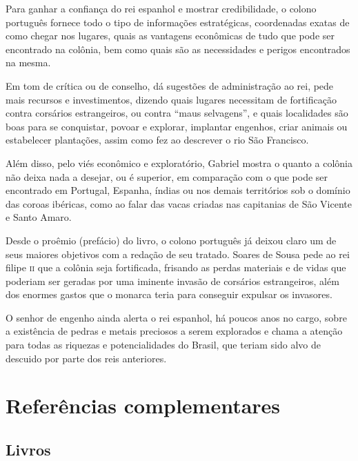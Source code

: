\documentclass[12pt]{extarticle}
\begin{document}
Para ganhar a confiança do rei espanhol e mostrar credibilidade, o
colono português fornece todo o tipo de informações estratégicas,
coordenadas exatas de como chegar nos lugares, quais as vantagens
econômicas de tudo que pode ser encontrado na colônia, bem como quais
são as necessidades e perigos encontrados na mesma.

Em tom de crítica ou de conselho, dá sugestões de administração ao rei,
pede mais recursos e investimentos, dizendo quais lugares necessitam de
fortificação contra corsários estrangeiros, ou contra ``maus
selvagens'', e quais localidades são boas para se conquistar, povoar e
explorar, implantar engenhos, criar animais ou estabelecer plantações,
assim como fez ao descrever o rio São Francisco.

Além disso, pelo viés econômico e exploratório, Gabriel mostra o quanto
a colônia não deixa nada a desejar, ou é superior, em comparação com o
que pode ser encontrado em Portugal, Espanha, índias ou nos demais
territórios sob o domínio das coroas ibéricas, como ao falar das vacas
criadas nas capitanias de São Vicente e Santo Amaro.

Desde o proêmio (prefácio) do livro, o colono português já deixou claro
um de seus maiores objetivos com a redação de seu tratado.
Soares de Sousa pede ao rei filipe \textsc{ii} que a colônia seja fortificada,
frisando as perdas materiais e de vidas que poderiam ser geradas por uma
iminente invasão de corsários estrangeiros, além dos enormes gastos que
o monarca teria para conseguir expulsar os invasores.

O senhor de engenho ainda alerta o rei espanhol, há poucos anos no
cargo, sobre a existência de pedras e metais preciosos a serem
explorados e chama a atenção para todas as riquezas e potencialidades do
Brasil, que teriam sido alvo de descuido por parte dos reis anteriores.


\section{Referências complementares}

\subsection{Livros}
\end{document}
